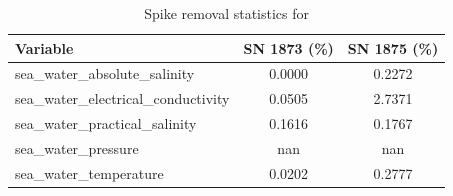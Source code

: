 \begin{table}[h]
\centering
\caption{Spike removal statistics for \projectname{} \casenumber{}}
\label{tab:str13_spike_stats}
\begin{tabular}{|l|c|c|}
\hline
Variable & SN 1873 (\%) & SN 1875 (\%) \\
\hline
sea\_water\_absolute\_salinity & 0.0000 & 0.2272 \\
sea\_water\_electrical\_conductivity & 0.0505 & 2.7371 \\
sea\_water\_practical\_salinity & 0.1616 & 0.1767 \\
sea\_water\_pressure & nan & nan \\
sea\_water\_temperature & 0.0202 & 0.2777 \\
\hline
\end{tabular}
\end{table}
